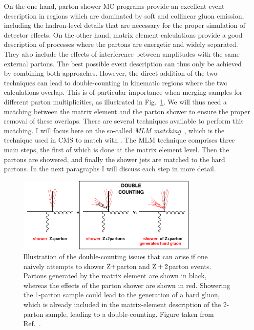 On the one hand, parton shower MC programs provide an excellent event description in regions which
are dominated by soft and collinear gluon emission, including the hadron-level details that are
necessary for the proper simulation of detector effects. 
On the other hand, matrix element calculations provide a good description of processes where
the partons are energetic and widely separated. They also include the effects of
interference between amplitudes with the same external partons. 
The best possible event description can thus only be achieved by combining both approaches.
However, the direct addition of the two techniques can lead to double-counting in kinematic regions
where the two calculations overlap. This is of particular importance when merging samples for
different parton multiplicities, as illustrated in Fig.~\ref{fig:overlap}.
We will thus need a matching between the matrix element
and the parton shower to ensure the proper removal of these overlaps.
There are several techniques available to perform this matching. I will focus here on the so-called
\textit{MLM matching}~\cite{Alwall:2007fs}, which is the technique used in CMS to match \MADGRAPH
with \PYTHIA. The MLM technique comprises three main steps, the first of which is done at the
matrix element level. Then the partons are showered, and finally the shower jets are matched to the
hard partons. 
In the next paragraphs I will discuss each step in more detail. 


\begin{figure}[t]
  \centering
  \includegraphics[width=0.8\textwidth]{figures/eventreco_generation/overlap}
  \caption{ Illustration of the double-counting issues that can arise if one naively attempts to
shower $\mathrm{Z}+$parton and $\mathrm{Z}+2$parton events. Partons generated by the matrix element are
shown in black, whereas the effects of the parton shower are shown in red. Showering the 1-parton
sample could lead to the generation of a hard gluon, which is already included in the matrix-element
description of the 2-parton sample, leading to a double-counting. Figure taken from
Ref.~\cite{Salam:2010zt}. 
  \label{fig:overlap}}
\end{figure}


